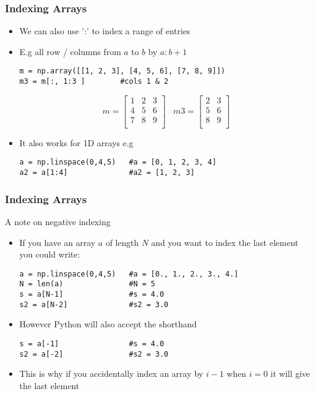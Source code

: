 \documentclass[english,14pt]{beamer}
\begin{document}
\begin{frame}[fragile]
\frametitle{Indexing Arrays}
	\begin{itemize}
		\item We can also use ':' to index a range of entries 
		\item E.g all row / columns from $a$ to $b$ by $a:b+1$
\begin{lstlisting}[style=CStyle]
m = np.array([[1, 2, 3], [4, 5, 6], [7, 8, 9]])
m3 = m[:, 1:3 ]        #cols 1 & 2 
\end{lstlisting}

\[		
m = \left[ 
\begin{array}{ccc}
     1 & 2 & 3   \\
     4 & 5 & 6   \\
     7 & 8 & 9  \\     
\end{array} \right] 
\;\;\; m3 = \left[ 
\begin{array}{cc}
     2  & 3   \\
     5  & 6   \\
     8  & 9  \\     
\end{array} \right]
\]
	\item It also works for 1D arrays e.g
\begin{lstlisting}[style=CStyle]		
a = np.linspace(0,4,5)   #a = [0, 1, 2, 3, 4] 
a2 = a[1:4]              #a2 = [1, 2, 3] 
\end{lstlisting}
	\end{itemize}
\end{frame}

\begin{frame}[fragile]
\frametitle{Indexing Arrays}
A note on negative indexing
	\begin{itemize}
		\item If you have an array $a$ of length $N$ and you want to index the last element you could write: 
\begin{lstlisting}[style=CStyle]
a = np.linspace(0,4,5)   #a = [0., 1., 2., 3., 4.] 
N = len(a)               #N = 5
s = a[N-1]               #s = 4.0
s2 = a[N-2]              #s2 = 3.0
\end{lstlisting}
\item However Python will also accept the shorthand
\begin{lstlisting}[style=CStyle]
s = a[-1]                #s = 4.0
s2 = a[-2]               #s2 = 3.0
\end{lstlisting}
\item This is why if you accidentally index an array by $i-1$ when $i = 0$ it will give the last element
	\end{itemize}
\end{frame}
\end{document}
